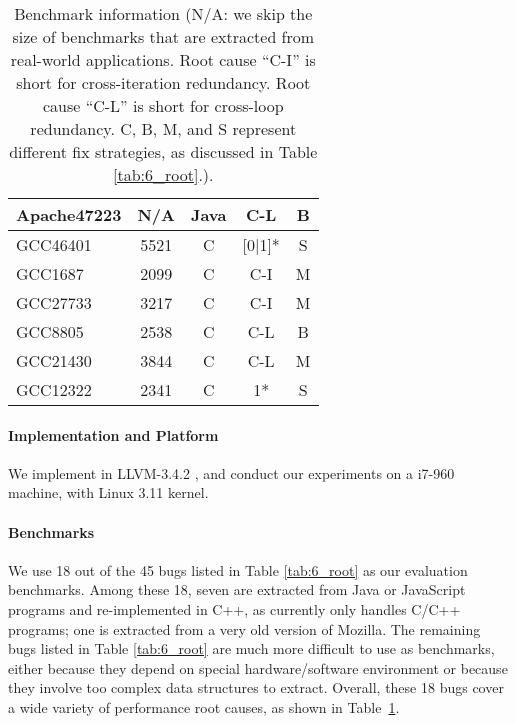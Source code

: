\begin{table}
\begin{tabular}{lcccc}
   Apache47223           & N/A             & Java                   &  C-L         & B \\
   \midrule
   GCC46401              & 5521            & C                      &  [0$|$1]*    & S   \\
   GCC1687               & 2099            & C                      &  C-I         & M \\
   GCC27733              & 3217            & C                      &  C-I         & M \\
   GCC8805               & 2538            & C                      &  C-L         & B\\
   GCC21430              & 3844            & C                      &  C-L         & M \\
   GCC12322              & 2341            & C                      &  1*          & S\\
\bottomrule
   \end{tabular}
  \caption{Benchmark information
  (N/A: we skip the size of benchmarks that are extracted from real-world applications.
  Root cause ``C-I'' is short for cross-iteration redundancy.
  Root cause ``C-L'' is short for cross-loop redundancy.
  C, B, M, and S represent different fix strategies, as discussed in
  Table \ref{tab:6_root}.). 
 }
  \label{tab:6_benchmarks}
\end{table}

\paragraph{Implementation and Platform}
We implement \Tool in LLVM-3.4.2 \citep{llvm}, and conduct our
experiments on a i7-960 machine, with Linux 3.11 kernel. 

\paragraph{Benchmarks}
We use 18 out of the 45 bugs listed in Table \ref{tab:6_root} as our 
evaluation benchmarks. Among these 18, seven are extracted from Java or JavaScript
programs and re-implemented in C++, as \Tool currently only handles C/C++
programs; one is extracted from a very old version of Mozilla.
The remaining bugs listed in Table \ref{tab:6_root} are much more difficult to
use as benchmarks, 
either because they depend on special hardware/software environment
or because they involve too complex data structures to extract. 
Overall, these 18 bugs cover a wide variety of performance root causes, as 
shown in Table~\ref{tab:6_benchmarks}. 

